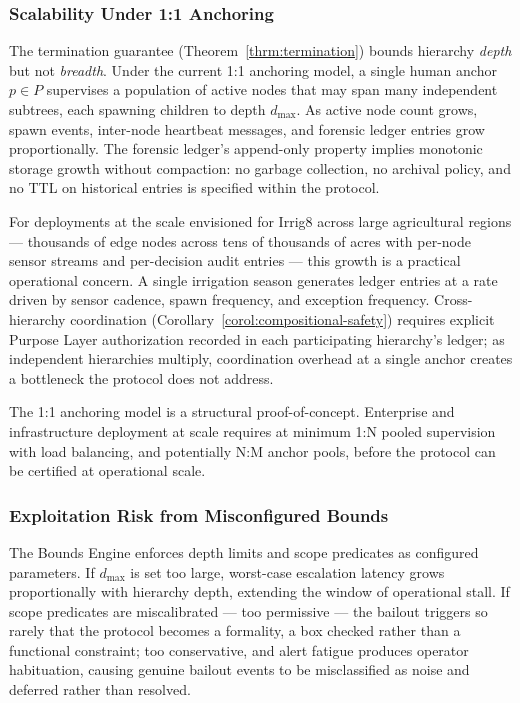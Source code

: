 \subsubsection{Scalability Under 1:1 Anchoring}
\label{sec:limitations-scalability}

The termination guarantee (Theorem~\ref{thrm:termination}) bounds hierarchy \emph{depth} but not \emph{breadth}. Under the current 1:1 anchoring model, a single human anchor $p \in P$ supervises a population of active nodes that may span many independent subtrees, each spawning children to depth $d_{\max}$. As active node count grows, spawn events, inter-node heartbeat messages, and forensic ledger entries grow proportionally. The forensic ledger's append-only property implies monotonic storage growth without compaction: no garbage collection, no archival policy, and no TTL on historical entries is specified within the protocol.

For deployments at the scale envisioned for Irrig8 across large agricultural regions --- thousands of edge nodes across tens of thousands of acres with per-node sensor streams and per-decision audit entries --- this growth is a practical operational concern. A single irrigation season generates ledger entries at a rate driven by sensor cadence, spawn frequency, and exception frequency. Cross-hierarchy coordination (Corollary~\ref{corol:compositional-safety}) requires explicit Purpose Layer authorization recorded in each participating hierarchy's ledger; as independent hierarchies multiply, coordination overhead at a single anchor creates a bottleneck the protocol does not address.

The 1:1 anchoring model is a structural proof-of-concept. Enterprise and infrastructure deployment at scale requires at minimum 1:N pooled supervision with load balancing, and potentially N:M anchor pools, before the protocol can be certified at operational scale.

\subsubsection{Exploitation Risk from Misconfigured Bounds}
\label{sec:limitations-exploitation}

The Bounds Engine enforces depth limits and scope predicates as configured parameters. If $d_{\max}$ is set too large, worst-case escalation latency grows proportionally with hierarchy depth, extending the window of operational stall. If scope predicates are miscalibrated --- too permissive --- the bailout triggers so rarely that the protocol becomes a formality, a box checked rather than a functional constraint; too conservative, and alert fatigue produces operator habituation, causing genuine bailout events to be misclassified as noise and deferred rather than resolved.

